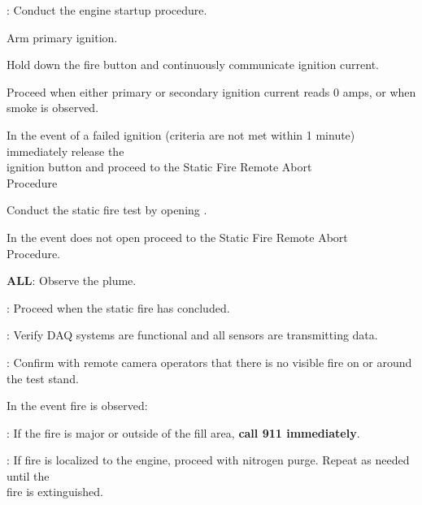 \begin{checklist}
    \item \rlcs{}: Conduct the engine startup procedure. 
        \begin{checklist}
         \item Arm primary ignition.
         \item  Hold down the fire button and continuously communicate ignition current. 
         \item Proceed when either primary or secondary ignition current reads 0 amps, or when smoke is observed.
         \begin{checklist}[label=$\bullet$]
            \item In the event of a failed ignition (criteria  are not met within 1 minute) immediately release the \\ \phantom{} \hspace{12ex} ignition button and proceed to the Static Fire Remote Abort \\ \phantom{} \hspace{12ex} Procedure
            \end{checklist}
         \item Conduct the static fire test by opening \inj{}. 
            \begin{checklist}[label=$\bullet$]
            \item In the event \inj{} does not open proceed to the Static Fire Remote Abort \\ \phantom{} \hspace{12ex} Procedure.
            \end{checklist}
         \item \textbf{ALL}: Observe the plume.
         \end{checklist}
    \item \ops{}: Proceed when the static fire has concluded.
    \item \daq{}: Verify DAQ systems are functional and all sensors are transmitting data. 
    \item \ops{}: Confirm with remote camera operators that there is no visible fire on or around the test stand. 
    \begin{checklist}[label=$\bullet$]
            \item In the event fire is observed:
             \begin{checklist}
                \item \ops{}: If the fire is major or outside of the fill area, \textbf{call 911 immediately}.
                \item \ops{}:  If fire is localized to the engine, proceed with nitrogen purge. Repeat as needed until the \\ \phantom{} \hspace{12ex} fire is extinguished. 

\end{checklist}
\end{checklist}
\end{checklist}
